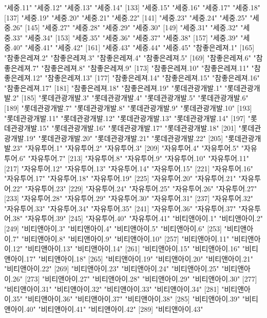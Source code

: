 \documentclass[tutorial.tex]{subfiles}
\begin{document}
\begin{Schunk}
\begin{Soutput}
[129] "세중.11"         "세중.12"         "세중.13"         "세중.14"        
[133] "세중.15"         "세중.16"         "세중.17"         "세중.18"        
[137] "세중.19"         "세중.20"         "세중.21"         "세중.22"        
[141] "세중.23"         "세중.24"         "세중.25"         "세중.26"        
[145] "세중.27"         "세중.28"         "세중.29"         "세중.30"        
[149] "세중.31"         "세중.32"         "세중.33"         "세중.34"        
[153] "세중.35"         "세중.36"         "세중.37"         "세중.38"        
[157] "세중.39"         "세중.40"         "세중.41"         "세중.42"        
[161] "세중.43"         "세중.44"         "세중.45"         "참좋은레져.1"   
[165] "참좋은레져.2"    "참좋은레져.3"    "참좋은레져.4"    "참좋은레져.5"   
[169] "참좋은레져.6"    "참좋은레져.7"    "참좋은레져.8"    "참좋은레져.9"   
[173] "참좋은레져.10"   "참좋은레져.11"   "참좋은레져.12"   "참좋은레져.13"  
[177] "참좋은레져.14"   "참좋은레져.15"   "참좋은레져.16"   "참좋은레져.17"  
[181] "참좋은레져.18"   "참좋은레져.19"   "롯데관광개발.1"  "롯데관광개발.2" 
[185] "롯데관광개발.3"  "롯데관광개발.4"  "롯데관광개발.5"  "롯데관광개발.6" 
[189] "롯데관광개발.7"  "롯데관광개발.8"  "롯데관광개발.9"  "롯데관광개발.10"
[193] "롯데관광개발.11" "롯데관광개발.12" "롯데관광개발.13" "롯데관광개발.14"
[197] "롯데관광개발.15" "롯데관광개발.16" "롯데관광개발.17" "롯데관광개발.18"
[201] "롯데관광개발.19" "롯데관광개발.20" "롯데관광개발.21" "롯데관광개발.22"
[205] "롯데관광개발.23" "자유투어.1"      "자유투어.2"      "자유투어.3"     
[209] "자유투어.4"      "자유투어.5"      "자유투어.6"      "자유투어.7"     
[213] "자유투어.8"      "자유투어.9"      "자유투어.10"     "자유투어.11"    
[217] "자유투어.12"     "자유투어.13"     "자유투어.14"     "자유투어.15"    
[221] "자유투어.16"     "자유투어.17"     "자유투어.18"     "자유투어.19"    
[225] "자유투어.20"     "자유투어.21"     "자유투어.22"     "자유투어.23"    
[229] "자유투어.24"     "자유투어.25"     "자유투어.26"     "자유투어.27"    
[233] "자유투어.28"     "자유투어.29"     "자유투어.30"     "자유투어.31"    
[237] "자유투어.32"     "자유투어.33"     "자유투어.34"     "자유투어.35"    
[241] "자유투어.36"     "자유투어.37"     "자유투어.38"     "자유투어.39"    
[245] "자유투어.40"     "자유투어.41"     "비티앤아이.1"    "비티앤아이.2"   
[249] "비티앤아이.3"    "비티앤아이.4"    "비티앤아이.5"    "비티앤아이.6"   
[253] "비티앤아이.7"    "비티앤아이.8"    "비티앤아이.9"    "비티앤아이.10"  
[257] "비티앤아이.11"   "비티앤아이.12"   "비티앤아이.13"   "비티앤아이.14"  
[261] "비티앤아이.15"   "비티앤아이.16"   "비티앤아이.17"   "비티앤아이.18"  
[265] "비티앤아이.19"   "비티앤아이.20"   "비티앤아이.21"   "비티앤아이.22"  
[269] "비티앤아이.23"   "비티앤아이.24"   "비티앤아이.25"   "비티앤아이.26"  
[273] "비티앤아이.27"   "비티앤아이.28"   "비티앤아이.29"   "비티앤아이.30"  
[277] "비티앤아이.31"   "비티앤아이.32"   "비티앤아이.33"   "비티앤아이.34"  
[281] "비티앤아이.35"   "비티앤아이.36"   "비티앤아이.37"   "비티앤아이.38"  
[285] "비티앤아이.39"   "비티앤아이.40"   "비티앤아이.41"   "비티앤아이.42"  
[289] "비티앤아이.43"  
\end{Soutput}
\end{Schunk}
\end{document}
